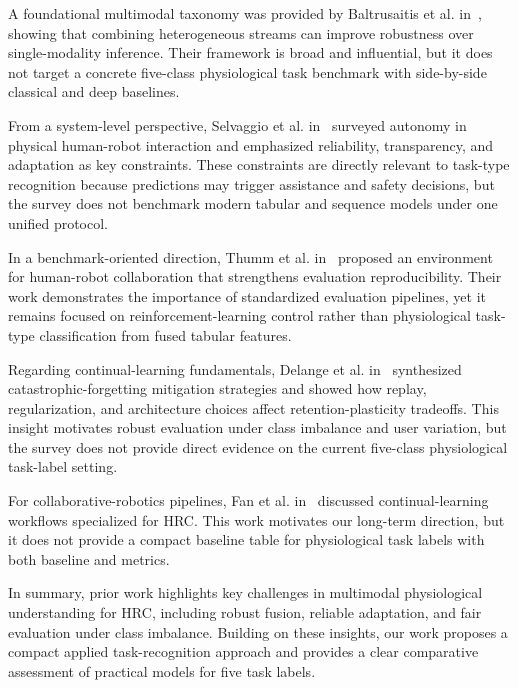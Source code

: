\documentclass{llncs}
\begin{document}
A foundational multimodal taxonomy was provided by Baltrusaitis et al. in~\cite{baltrusaitis2019multimodal}, showing that combining heterogeneous streams can improve robustness over single-modality inference. Their framework is broad and influential, but it does not target a concrete five-class physiological task benchmark with side-by-side classical and deep baselines.


From a system-level perspective, Selvaggio et al. in~\cite{selvaggio2021autonomy} surveyed autonomy in physical human-robot interaction and emphasized reliability, transparency, and adaptation as key constraints. These constraints are directly relevant to task-type recognition because predictions may trigger assistance and safety decisions, but the survey does not benchmark modern tabular and sequence models under one unified protocol.
 
In a benchmark-oriented direction, Thumm et al. in~\cite{thumm2024hrgym} proposed an environment for human-robot collaboration that strengthens evaluation reproducibility. Their work demonstrates the importance of standardized evaluation pipelines, yet it remains focused on reinforcement-learning control rather than physiological task-type classification from fused tabular features.

Regarding continual-learning fundamentals, Delange et al. in~\cite{delange2022continual} synthesized catastrophic-forgetting mitigation strategies and showed how replay, regularization, and architecture choices affect retention-plasticity tradeoffs. This insight motivates robust evaluation under class imbalance and user variation, but the survey does not provide direct evidence on the current five-class physiological task-label setting.

For collaborative-robotics pipelines, Fan et al. in~\cite{fan2024continualhrc} discussed continual-learning workflows specialized for HRC. This work motivates our long-term direction, but it does not provide a compact baseline table for physiological task labels with both baseline and metrics.

In summary, prior work highlights key challenges in multimodal physiological understanding for HRC, including robust fusion, reliable adaptation, and fair evaluation under class imbalance. Building on these insights, our work proposes a compact applied task-recognition approach and provides a clear comparative assessment of practical models for five task labels.
\end{document}
